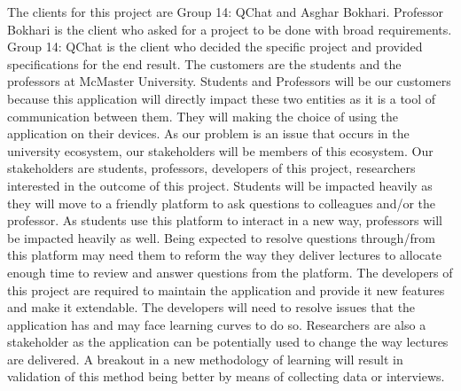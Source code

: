 \documentclass[12pt, titlepage]{article}
\begin{document}
The clients for this project are Group 14: QChat and Asghar Bokhari. Professor Bokhari is the client who asked for a project to be done with broad requirements. Group 14: QChat is the client who decided the specific project and provided specifications for the end result. The customers are the students and the professors at McMaster University. Students and Professors will be our customers because this application will directly impact these two entities as it is a tool of communication between them. They will making the choice of using the application on their devices. As our problem is an issue that occurs in the university ecosystem, our stakeholders will be members of this ecosystem. Our stakeholders are students, professors, developers of this project, researchers interested in the outcome of this project. Students will be impacted heavily as they will move to a friendly platform to ask questions to colleagues and/or the professor. As students use this platform to interact in a new way, professors will be impacted heavily as well. Being expected to resolve questions through/from this platform may need them to reform the way they deliver lectures to allocate enough time to review and answer questions from the platform. The developers of this project are required to maintain the application and provide it new features and make it extendable. The developers will need to resolve issues that the application has and may face learning curves to do so. Researchers are also a stakeholder as the application can be potentially used to change the way lectures are delivered. A breakout in a new methodology of learning will result in validation of this method being better by means of collecting data or interviews. 
\end{document}
